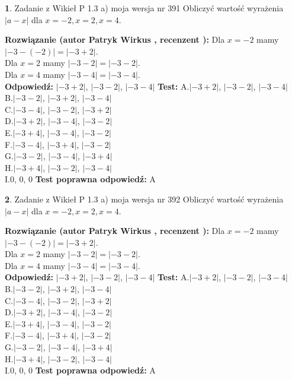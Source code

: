 \documentclass[12pt, a4paper]{article}
\theoremstyle{definition} %
\newtheorem{zad}{}
\newcommand{\zadStart}[1]{\begin{zad}#1\newline}
\newcommand{\zadStop}{\end{zad}}
\newcommand{\rozwStart}[2]{\noindent \textbf{Rozwiązanie (autor #1 , recenzent #2): }\newline}
\newcommand{\rozwStop}{\newline}
\newcommand{\odpStart}{\noindent \textbf{Odpowiedź:}\newline}
\newcommand{\odpStop}{\newline}
\newcommand{\testStart}{\noindent \textbf{Test:}\newline}
\newcommand{\testStop}{\newline}
\newcommand{\kluczStart}{\noindent \textbf{Test poprawna odpowiedź:}\newline}
\newcommand{\kluczStop}{\newline}
\begin{document}
\zadStart{Zadanie z Wikieł P 1.3 a) moja wersja nr 391}
Obliczyć wartość wyrażenia $|a - x|$ dla $x=-2,x=2,x=4$.
\zadStop
\rozwStart{Patryk Wirkus}{}
Dla $x = -2$ mamy $|-3 - (-2)| = |-3 + 2|$.\\
Dla $x = 2$ mamy $|-3 - 2| = |-3 - 2|$.\\
Dla $x = 4$ mamy $|-3 - 4| = |-3 - 4|$.\\
\rozwStop
\odpStart
$|-3 + 2|$, $|-3 - 2|$, $|-3 - 4|$
\odpStop
\testStart
A.$|-3 + 2|$, $|-3 - 2|$, $|-3 - 4|$\\
B.$|-3 - 2|$, $|-3 + 2|$, $|-3 - 4|$\\
C.$|-3 - 4|$, $|-3 - 2|$, $|-3 + 2|$\\
D.$|-3 + 2|$, $|-3 - 4|$, $|-3 - 2|$\\
E.$|-3 + 4|$, $|-3 - 4|$, $|-3 - 2|$\\
F.$|-3 - 4|$, $|-3 + 4|$, $|-3 - 2|$\\
G.$|-3 - 2|$, $|-3 - 4|$, $|-3 + 4|$\\
H.$|-3 + 4|$, $|-3 - 2|$, $|-3 - 4|$\\
I.$0$, $0$, $0$
\testStop
\kluczStart
A
\kluczStop



\zadStart{Zadanie z Wikieł P 1.3 a) moja wersja nr 392}
Obliczyć wartość wyrażenia $|a - x|$ dla $x=-2,x=2,x=4$.
\zadStop
\rozwStart{Patryk Wirkus}{}
Dla $x = -2$ mamy $|-3 - (-2)| = |-3 + 2|$.\\
Dla $x = 2$ mamy $|-3 - 2| = |-3 - 2|$.\\
Dla $x = 4$ mamy $|-3 - 4| = |-3 - 4|$.\\
\rozwStop
\odpStart
$|-3 + 2|$, $|-3 - 2|$, $|-3 - 4|$
\odpStop
\testStart
A.$|-3 + 2|$, $|-3 - 2|$, $|-3 - 4|$\\
B.$|-3 - 2|$, $|-3 + 2|$, $|-3 - 4|$\\
C.$|-3 - 4|$, $|-3 - 2|$, $|-3 + 2|$\\
D.$|-3 + 2|$, $|-3 - 4|$, $|-3 - 2|$\\
E.$|-3 + 4|$, $|-3 - 4|$, $|-3 - 2|$\\
F.$|-3 - 4|$, $|-3 + 4|$, $|-3 - 2|$\\
G.$|-3 - 2|$, $|-3 - 4|$, $|-3 + 4|$\\
H.$|-3 + 4|$, $|-3 - 2|$, $|-3 - 4|$\\
I.$0$, $0$, $0$
\testStop
\kluczStart
A
\kluczStop
\end{document}
